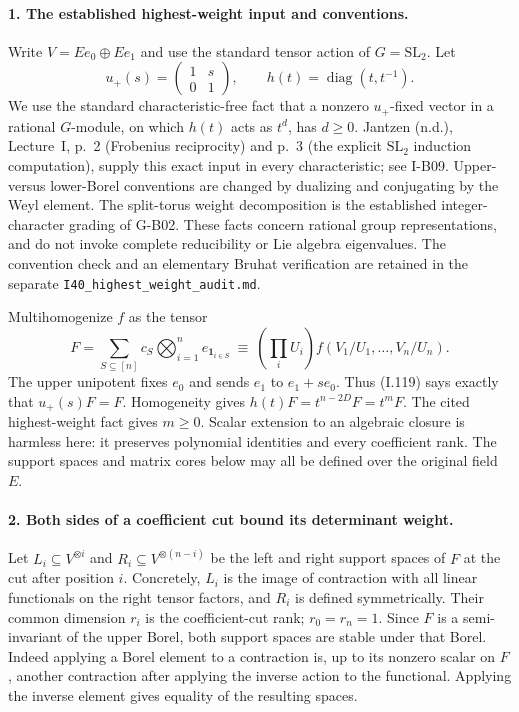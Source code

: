 \paragraph{1. The established highest-weight input and conventions.}
Write $V=E e_0\oplus E e_1$ and use the standard tensor action of
$G=\mathrm{SL}_2$. Let
\[
 u_+(s)=\begin{pmatrix}1&s\\0&1\end{pmatrix},
 \qquad h(t)=\operatorname{diag}(t,t^{-1}).
\]
We use the standard characteristic-free fact that a nonzero
$u_+$-fixed vector in a rational $G$-module, on which $h(t)$ acts
as $t^d$, has $d\ge0$. Jantzen (n.d.), Lecture~I, p.~2
(Frobenius reciprocity) and p.~3 (the explicit
$\mathrm{SL}_2$ induction computation), supply this exact input
in every characteristic; see I-B09. Upper- versus lower-Borel
conventions are changed by dualizing and conjugating by the Weyl
element. The split-torus weight decomposition is the established
integer-character grading of G-B02. These facts concern rational
group representations, and do not invoke complete reducibility
or Lie algebra eigenvalues. The convention check and an
elementary Bruhat verification are retained in the separate
\texttt{I40\_highest\_weight\_audit.md}.

Multihomogenize $f$ as the tensor
\[
 F=\sum_{S\subseteq[n]}c_S
       \bigotimes_{i=1}^n e_{\mathbf1_{i\in S}}
   \ \equiv\ \left(\prod_i U_i\right)
                f(V_1/U_1,\ldots,V_n/U_n).
 \tag{I.121}
\]
The upper unipotent fixes $e_0$ and sends $e_1$ to $e_1+s e_0$.
Thus (I.119) says exactly that $u_+(s)F=F$. Homogeneity gives
$h(t)F=t^{n-2D}F=t^mF$. The cited highest-weight fact gives
$m\ge0$. Scalar extension to an algebraic closure is harmless
here: it preserves polynomial identities and every coefficient
rank. The support spaces and matrix cores below may all be
defined over the original field $E$.

\paragraph{2. Both sides of a coefficient cut bound its determinant weight.}
Let $L_i\subseteq V^{\otimes i}$ and
$R_i\subseteq V^{\otimes(n-i)}$ be the left and right support
spaces of $F$ at the cut after position $i$. Concretely, $L_i$
is the image of contraction with all linear functionals on the
right tensor factors, and $R_i$ is defined symmetrically.
Their common dimension $r_i$ is the coefficient-cut rank;
$r_0=r_n=1$. Since $F$ is a semi-invariant of the upper Borel,
both support spaces are stable under that Borel. Indeed applying
a Borel element to a contraction is, up to its nonzero scalar
on $F$, another contraction after applying the inverse action
to the functional. Applying the inverse element gives equality
of the resulting spaces.


